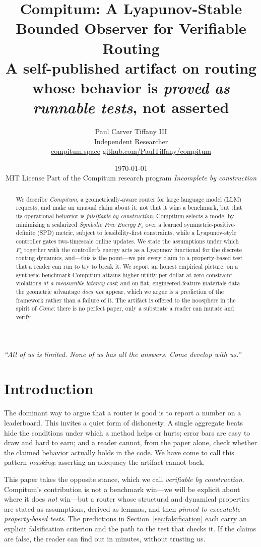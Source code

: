 \documentclass[11pt]{article}
\title{\textbf{Compitum: A Lyapunov-Stable Bounded Observer for Verifiable Routing}\\[2pt]
\large A self-published artifact on routing whose behavior is \emph{proved as runnable tests}, not asserted}
\author{Paul Carver Tiffany III\\
\small Independent Researcher\\
\small \href{https://compitum.space}{compitum.space} \quad\textbar\quad \href{https://github.com/PaulTiffany/compitum}{github.com/PaulTiffany/compitum}}
\date{\today\\[6pt]
\small MIT License \quad\textbar\quad Part of the Compitum research program \quad\textbar\quad \emph{Incomplete by construction}}
\theoremstyle{plain}
\theoremstyle{definition}
\theoremstyle{remark}
\newcommand{\Fs}{F_{s}}
\begin{document}
\maketitle

\begin{abstract}
We describe \emph{Compitum}, a geometrically-aware router for large language model
(LLM) requests, and make an unusual claim about it: not that it wins a benchmark,
but that its operational behavior is \emph{falsifiable by construction}. Compitum
selects a model by minimizing a scalarized \emph{Symbolic Free Energy} $\Fs$ over a
learned symmetric-positive-definite (SPD) metric, subject to feasibility-first
constraints, while a Lyapunov-style controller gates two-timescale online updates.
We state the assumptions under which $\Fs$ together with the controller's energy acts
as a Lyapunov functional for the discrete routing dynamics, and---this is the point---we
pin every claim to a property-based test that a reader can run to try to break it. We
report an honest empirical picture: on a synthetic benchmark Compitum attains higher
utility-per-dollar at zero constraint violations \emph{at a measurable latency cost};
and on flat, engineered-feature materials data the geometric advantage \emph{does not}
appear, which we argue is a prediction of the framework rather than a failure of it.
The artifact is offered to the noosphere in the spirit of \emph{Come}: there is no
perfect paper, only a substrate a reader can mutate and verify.
\end{abstract}

\begin{center}
\emph{``All of us is limited. None of us has all the answers. Come develop with us.''}
\end{center}

\section{Introduction}

The dominant way to argue that a router is good is to report a number on a leaderboard.
This invites a quiet form of dishonesty. A single aggregate beats hide the conditions
under which a method helps or hurts; error bars are easy to draw and hard to earn; and a
reader cannot, from the paper alone, check whether the claimed behavior actually holds in
the code. We have come to call this pattern \emph{masking}: asserting an adequacy the
artifact cannot back.

This paper takes the opposite stance, which we call \emph{verifiable by construction}.
Compitum's contribution is not a benchmark win---we will be explicit about where it does
\emph{not} win---but a router whose structural and dynamical properties are stated as
assumptions, derived as lemmas, and then \emph{pinned to executable property-based tests}.
The predictions in Section~\ref{sec:falsification} each carry an explicit falsification
criterion and the path to the test that checks it. If the claims are false, the reader
can find out in minutes, without trusting us.
\end{document}
